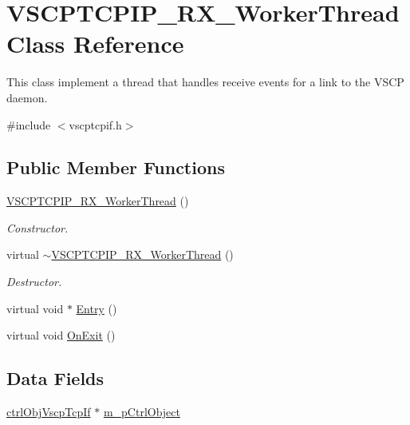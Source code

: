 \hypertarget{class_v_s_c_p_t_c_p_i_p___r_x___worker_thread}{
\section{VSCPTCPIP\_\-RX\_\-WorkerThread Class Reference}
\label{d2/d23/class_v_s_c_p_t_c_p_i_p___r_x___worker_thread}
}


This class implement a thread that handles receive events for a link to the VSCP daemon.  




{\ttfamily \#include $<$vscptcpif.h$>$}

\subsection*{Public Member Functions}
\begin{DoxyCompactItemize}
\item 
\hypertarget{class_v_s_c_p_t_c_p_i_p___r_x___worker_thread_ae65f8e68f3aee5fa51bdbcf0a9a78a32}{
\hyperlink{class_v_s_c_p_t_c_p_i_p___r_x___worker_thread_ae65f8e68f3aee5fa51bdbcf0a9a78a32}{VSCPTCPIP\_\-RX\_\-WorkerThread} ()}
\label{d2/d23/class_v_s_c_p_t_c_p_i_p___r_x___worker_thread_ae65f8e68f3aee5fa51bdbcf0a9a78a32}

\begin{DoxyCompactList}\small\item\em Constructor. \end{DoxyCompactList}\item 
\hypertarget{class_v_s_c_p_t_c_p_i_p___r_x___worker_thread_a34823b6b2e375de5f45d049bb38e8afd}{
virtual \hyperlink{class_v_s_c_p_t_c_p_i_p___r_x___worker_thread_a34823b6b2e375de5f45d049bb38e8afd}{$\sim$VSCPTCPIP\_\-RX\_\-WorkerThread} ()}
\label{d2/d23/class_v_s_c_p_t_c_p_i_p___r_x___worker_thread_a34823b6b2e375de5f45d049bb38e8afd}

\begin{DoxyCompactList}\small\item\em Destructor. \end{DoxyCompactList}\item 
virtual void $\ast$ \hyperlink{class_v_s_c_p_t_c_p_i_p___r_x___worker_thread_ab58e6b94a57d07d55a445f204a5d2f23}{Entry} ()
\item 
virtual void \hyperlink{class_v_s_c_p_t_c_p_i_p___r_x___worker_thread_a432ba960371cce80994cf4e44a3f66b1}{OnExit} ()
\end{DoxyCompactItemize}
\subsection*{Data Fields}
\begin{DoxyCompactItemize}
\item 
\hyperlink{classctrl_obj_vscp_tcp_if}{ctrlObjVscpTcpIf} $\ast$ \hyperlink{class_v_s_c_p_t_c_p_i_p___r_x___worker_thread_a987f7672856a7f61372c995773c3e63d}{m\_\-pCtrlObject}
\end{DoxyCompactItemize}


